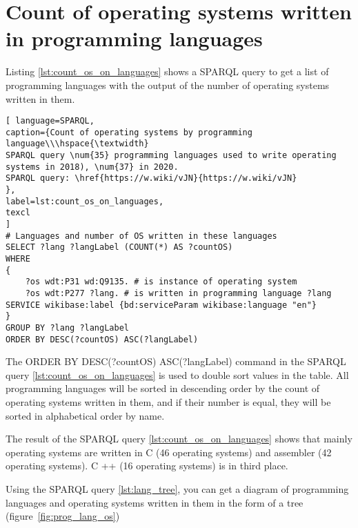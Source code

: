 \section{Count of operating systems written in programming languages}

Listing \ref{lst:count_os_on_languages} shows a SPARQL query to get a list of programming languages with the output of the number of operating systems written in them.

\begin{lstlisting}[ language=SPARQL, 
caption={Count of operating systems by programming language\\\hspace{\textwidth}
SPARQL query \num{35} programming languages used to write operating systems in 2018), \num{37} in 2020.
SPARQL query: \href{https://w.wiki/vJN}{https://w.wiki/vJN}
},
label=lst:count_os_on_languages,
texcl 
]
# Languages and number of OS written in these languages
SELECT ?lang ?langLabel (COUNT(*) AS ?countOS)
WHERE 
{
	?os wdt:P31 wd:Q9135. # is instance of operating system
	?os wdt:P277 ?lang. # is written in programming language ?lang
SERVICE wikibase:label {bd:serviceParam wikibase:language "en"}
}
GROUP BY ?lang ?langLabel
ORDER BY DESC(?countOS) ASC(?langLabel)
\end{lstlisting}

The ORDER BY DESC(?countOS) ASC(?langLabel) command in the SPARQL query \ref{lst:count_os_on_languages} is used to double sort values in the table. All programming languages will be sorted in descending order by the count of operating systems written in them, and if their number is equal, they will be sorted in alphabetical order by name.

The result of the SPARQL query \ref{lst:count_os_on_languages} shows that mainly operating systems are written in C (46 operating systems) and assembler (42 operating systems). C ++ (16 operating systems) is in third place.

Using the SPARQL query \ref{lst:lang_tree}, you can get a diagram of programming languages and operating systems written in them in the form of a tree (figure~\ref{fig:prog_lang_os})



